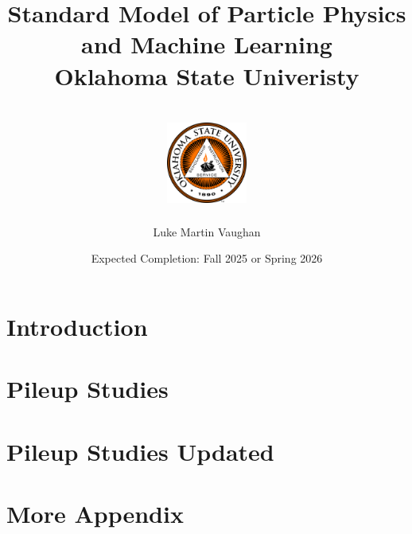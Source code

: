 \documentclass[12pt]{report}
\title{
  {Standard Model of Particle Physics\\ and Machine Learning}\\
  {\large Oklahoma State Univeristy}\\
  {\hfill}\\
  {\includegraphics[width=0.2\textwidth]{Oklahoma_State_University_seal.png}}
}
\author{Luke Martin Vaughan}
\date{Expected Completion: Fall 2025 or Spring 2026}
\begin{document}
\maketitle

\tableofcontents

%

%

%

%

\chapter{Introduction}


\appendix
\chapter{Pileup Studies}


\chapter{Pileup Studies Updated}


\chapter{More Appendix}

\end{document}
